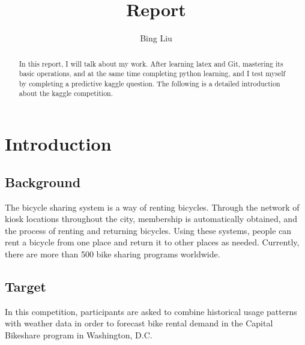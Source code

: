 \documentclass{amsart}
\begin{document}
%
%
\title[Report]{Report}%

\author{Bing Liu}
\address[A.~1]{School of Computer Science,\\ 
Jilin University, ChangChun 130012, China}%


%
\date{\gitAuthorDate}%

%

\begin{abstract}
	In this report, I will talk about my work. After learning latex and Git, mastering its basic operations, and at the same time completing python learning, and I test myself by completing a predictive kaggle question. The following is a detailed introduction about the kaggle competition.
\end{abstract}

%


\maketitle
\tableofcontents

\newpage

%
\section{Introduction}\label{sec-intro}

\subsection{Background}
The bicycle sharing system is a way of renting bicycles. Through the network of kiosk locations throughout the city, membership is automatically obtained, and the process of renting and returning bicycles. Using these systems, people can rent a bicycle from one place and return it to other places as needed. Currently, there are more than 500 bike sharing programs worldwide.\\

\subsection{Target}
In this competition, participants are asked to combine historical usage patterns with weather data in order to forecast bike rental demand in the Capital Bikeshare program in Washington, D.C.
\end{document}
